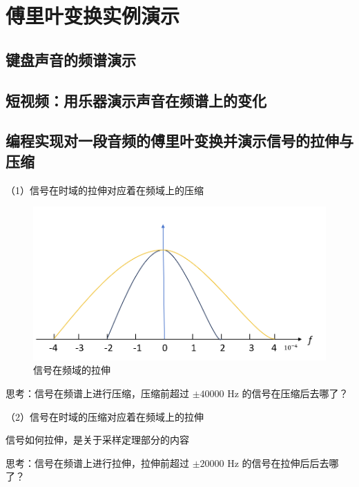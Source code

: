 \documentclass[UTF8]{ctexart}
\begin{document}
\section{傅里叶变换实例演示}
\subsection{键盘声音的频谱演示}
\subsection{短视频：用乐器演示声音在频谱上的变化}
\subsection{编程实现对一段音频的傅里叶变换并演示信号的拉伸与压缩}
（1）信号在时域的拉伸对应着在频域上的压缩 \par
\begin{figure}[h]
    \centering         %
    \includegraphics[scale=0.5]{3.png}
    \caption{信号在频域的拉伸}
\end{figure}
思考：信号在频谱上进行压缩，压缩前超过 $\pm 40000$  Hz 的信号在压缩后去哪了？\par
（2）信号在时域的压缩对应着在频域上的拉伸\par
信号如何拉伸，是关于采样定理部分的内容 \par
思考：信号在频谱上进行拉伸，拉伸前超过 $\pm 20000$  Hz 的信号在拉伸后后去哪了？\par
\end{document}
